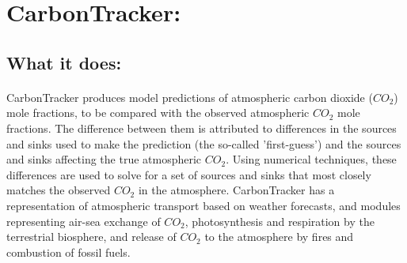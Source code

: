 \documentclass[12pt,letterpaper]{report}
\begin{document}
 \flushleft
 \section*{CarbonTracker:}
  \subsection*{What it does:}
   \paragraph{}
	 CarbonTracker produces model predictions of atmospheric carbon dioxide ($CO_2$)  mole fractions, to be compared with the observed atmospheric $CO_2$ mole fractions. The difference between them is attributed to differences in the sources and sinks used to make the prediction (the so-called 'first-guess') and the sources and sinks affecting the true atmospheric $CO_2$. Using numerical techniques, these differences are used to solve for a set of sources and sinks that most closely matches the observed $CO_2$ in the atmosphere. CarbonTracker has a representation of atmospheric transport based on weather forecasts, and modules representing air-sea exchange of $CO_2$, photosynthesis and respiration by the terrestrial biosphere, and release of $CO_2$ to the atmosphere by fires and combustion of fossil fuels.
\end{document}
